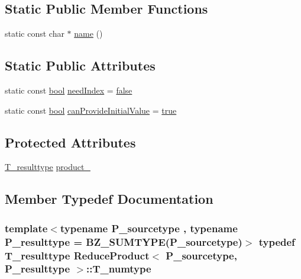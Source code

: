 \subsection*{Static Public Member Functions}
\begin{DoxyCompactItemize}
\item 
static const char $\ast$ \hyperlink{classReduceProduct_a9b45aeae03b4e9b933867f67a325a0d0}{name} ()
\end{DoxyCompactItemize}
\subsection*{Static Public Attributes}
\begin{DoxyCompactItemize}
\item 
static const \hyperlink{compiler_8h_abb452686968e48b67397da5f97445f5b}{bool} \hyperlink{classReduceProduct_a34a75451486743c6f900935a72b6a7bb}{need\+Index} = \hyperlink{compiler_8h_a65e9886d74aaee76545e83dd09011727}{false}
\item 
static const \hyperlink{compiler_8h_abb452686968e48b67397da5f97445f5b}{bool} \hyperlink{classReduceProduct_ac9075d9da723145572af602edbb9d994}{can\+Provide\+Initial\+Value} = \hyperlink{compiler_8h_a41f9c5fb8b08eb5dc3edce4dcb37fee7}{true}
\end{DoxyCompactItemize}
\subsection*{Protected Attributes}
\begin{DoxyCompactItemize}
\item 
\hyperlink{classReduceProduct_a042fd3f78d9968e5534a1783758cb838}{T\+\_\+resulttype} \hyperlink{classReduceProduct_a30301dc530285a65fb469edaa0d75864}{product\+\_\+}
\end{DoxyCompactItemize}


\subsection{Member Typedef Documentation}
\hypertarget{classReduceProduct_a1f98f468942c947df3e5357c0a09d10e}{}
\subsubsection[{T\+\_\+numtype}]{\setlength{\rightskip}{0pt plus 5cm}template$<$typename P\+\_\+sourcetype , typename P\+\_\+resulttype  = B\+Z\+\_\+\+S\+U\+M\+T\+Y\+P\+E(\+P\+\_\+sourcetype)$>$ typedef {\bf T\+\_\+resulttype} {\bf Reduce\+Product}$<$ P\+\_\+sourcetype, P\+\_\+resulttype $>$\+::{\bf T\+\_\+numtype}}\label{classReduceProduct_a1f98f468942c947df3e5357c0a09d10e}
\hypertarget{classReduceProduct_a042fd3f78d9968e5534a1783758cb838}{}
